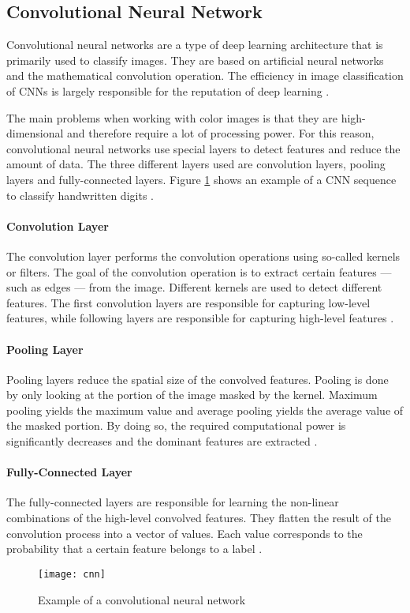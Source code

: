 \subsection{Convolutional Neural Network}
\label{subsec:cnn}

Convolutional neural networks are a type of deep learning architecture that is primarily used to classify images.
They are based on artificial neural networks and the mathematical convolution operation.
The efficiency in image classification of CNNs is largely responsible for the reputation of deep learning \cite{cnn_pathmind}.

The main problems when working with color images is that they are high-dimensional and therefore require a lot of processing power.
For this reason, convolutional neural networks use special layers to detect features and reduce the amount of data.
The three different layers used are convolution layers, pooling layers and fully-connected layers.
Figure \ref{fig:cnn} shows an example of a CNN sequence to classify handwritten digits \cite{cnn_pathmind}.

\paragraph{Convolution Layer}
The convolution layer performs the convolution operations using so-called kernels or filters.
The goal of the convolution operation is to extract certain features --- such as edges --- from the image.
Different kernels are used to detect different features.
The first convolution layers are responsible for capturing low-level features, while following layers are responsible for capturing high-level features \cite{cnn_tds}.
\clearpage

\paragraph{Pooling Layer}
Pooling layers reduce the spatial size of the convolved features.
Pooling is done by only looking at the portion of the image masked by the kernel.
Maximum pooling yields the maximum value and average pooling yields the average value of the masked portion.
By doing so, the required computational power is significantly decreases and the dominant features are extracted \cite{cnn_tds}.
\\

\paragraph{Fully-Connected Layer}
The fully-connected layers are responsible for learning the non-linear combinations of the high-level convolved features.
They flatten the result of the convolution process into a vector of values.
Each value corresponds to the probability that a certain feature belongs to a label \cite{cnn_tds}.

\begin{figure}[t]
  \centering
  \texttt{[image: cnn]}
  \caption{Example of a convolutional neural network \cite{cnn_tds}}
  \label{fig:cnn}
\end{figure}
